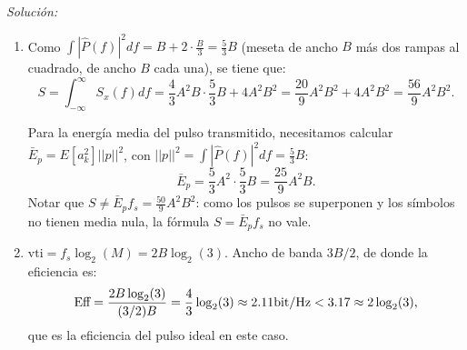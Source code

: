 \documentclass[a4paper,11pt]{article}
\newenvironment{solucion}[1][]{
\noindent \large \textsl{Solución:} \ifthenelse{\equal{#1}{}}{}{\emph{(#1)}}

\smallskip
}{
\bigskip
}
\begin{document}
\begin{solucion}
\begin{enumerate}
         Bosquejo:
         \begin{center}
        \end{center}

        \item Como $\int|\hat P(f)|^2df = B + 2\cdot\frac{B}{3}=\frac{5}{3}B$ (meseta de ancho $B$ más dos rampas al cuadrado, de ancho $B$ cada una), se tiene que:
        \begin{equation*}
                S = \int_{-\infty}^\infty S_x(f)df = \frac{4}{3}A^2B\cdot\frac{5}{3}B + 4A^2B^2= \frac{20}{9}A^2B^2 + 4A^2 B^2=\frac{56}{9}A^2B^2.
        \end{equation*}

        Para la energía media del pulso transmitido, necesitamos calcular $\bar{E}_p = E[a_k^2]||p||^2$, con $||p||^2=\int|\hat P(f)|^2df=\frac53 B$:
        \begin{equation*}
                \bar{E}_p = \frac{5}{3}A^2 \cdot \frac{5}{3}B = \frac{25}{9}A^2B.
        \end{equation*}
        Notar que $S\neq \bar E_p f_s=\frac{50}{9}A^2B^2$: como los pulsos se superponen y los símbolos no tienen media nula, la fórmula $S=\bar E_pf_s$ no vale.

        \item $\mathrm{vti} = f_s \log_2(M) = 2B \log_2(3)$. Ancho de banda $3B/2$, de donde la eficiencia es:
        \begin{equation*}
                \textrm{Eff} = \frac{2B\log_2(3)}{(3/2)B} = \frac{4}{3}\log_2(3) \approx 2.11 \unit{\bit/\hertz} < 3.17 \approx 2\log_2(3),
        \end{equation*}
        que es la eficiencia del pulso ideal en este caso.
        \end{enumerate}
\end{solucion}
\end{document}
